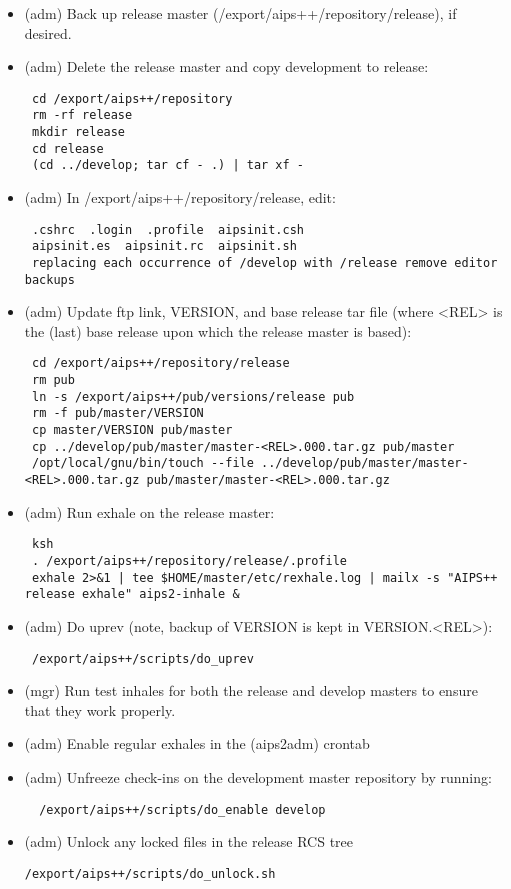 \begin{itemize}
\item (adm) Back up release master (/export/aips++/repository/release), if desired.

\item (adm) Delete the release master and copy development to release:
\begin{verbatim}
 cd /export/aips++/repository
 rm -rf release
 mkdir release
 cd release
 (cd ../develop; tar cf - .) | tar xf -
\end{verbatim}

\item (adm) In /export/aips++/repository/release, edit:
\begin{verbatim}										
 .cshrc  .login  .profile  aipsinit.csh
 aipsinit.es  aipsinit.rc  aipsinit.sh
 replacing each occurrence of /develop with /release remove editor backups
\end{verbatim}
												
\item (adm) Update ftp link, VERSION, and base release tar file (where <REL> is the (last) base
release upon which the release master is based):
\begin{verbatim}
 cd /export/aips++/repository/release
 rm pub
 ln -s /export/aips++/pub/versions/release pub
 rm -f pub/master/VERSION
 cp master/VERSION pub/master
 cp ../develop/pub/master/master-<REL>.000.tar.gz pub/master
 /opt/local/gnu/bin/touch --file ../develop/pub/master/master-<REL>.000.tar.gz pub/master/master-<REL>.000.tar.gz
\end{verbatim}
\item (adm) Run exhale on the release master:
\begin{verbatim}
 ksh
 . /export/aips++/repository/release/.profile
 exhale 2>&1 | tee $HOME/master/etc/rexhale.log | mailx -s "AIPS++ release exhale" aips2-inhale &
\end{verbatim}

\item(adm) Do uprev (note, backup of VERSION is kept in VERSION.<REL>):
\begin{verbatim}										
 /export/aips++/scripts/do_uprev
\end{verbatim}
\item (mgr) Run test inhales for both the release and develop masters to ensure
that they work properly.
\item (adm) Enable regular exhales in the (aips2adm) crontab
\item (adm) Unfreeze check-ins on the development master repository by running:
\begin{verbatim}
  /export/aips++/scripts/do_enable develop
\end{verbatim}
\item (adm) Unlock any locked files in the release RCS tree
\begin{verbatim}
/export/aips++/scripts/do_unlock.sh
\end{verbatim}
\end{itemize}


